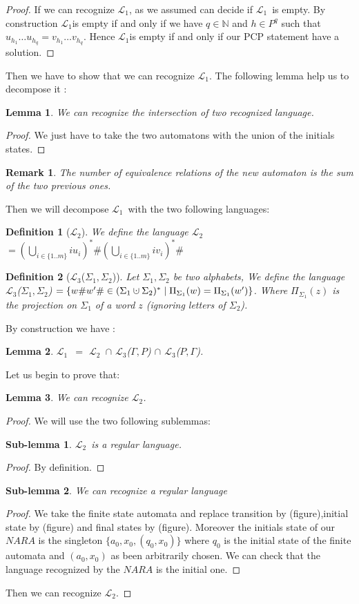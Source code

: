 \documentclass[a4paper,10pt]{report}
\newtheorem{lm}{Lemma}[thr]
\newtheorem{slm}{Sub-lemma}[lm]
\newtheorem{df}{Definition}
\newtheorem{rk}{Remark}
\newcommand{\Lu}{$\mathcal{L}_{1}$}
\newcommand{\Ld}{$\mathcal{L}_{2}$}
\newcommand{\Lt}{$\mathcal{L}_{3}$}
\newcommand{\sm}{\{1..m\}}
\newcommand{\cupdot}{\mathbin{\mathaccent\cdot\cup}}
\begin{document}
  \begin{proof}
   If we can recognize \Lu, as we assumed can decide if \Lu\ is empty.
   By construction \Lu is empty if and only if we have $q \in \mathbb N$ and  $h \in P ^ q$ such that $ u_{h_1}\ldots u_{h_q}  = v_{h_1}\ldots v_{h_q}$.
   Hence \Lu is empty if and only if our PCP statement have a solution.
  \end{proof}
  Then we have to show that we can recognize \Lu.
  The following lemma help us to decompose it :
  \begin{lm}
    We can recognize the intersection of two recognized language.
  \end{lm}
  \begin{proof}
   We just have to take the two automatons with the union of the initials states.
  \end{proof}
  \begin{rk}
   The number of equivalence relations of the new automaton is the sum of the two previous ones.
  \end{rk}
  Then we will decompose \Lu\ with the two following languages: 
  \begin{df}[\Ld]
    We define the language \Ld $= \left(\bigcup\limits_{i\in \sm} iu_i\right)^* \# \left(\bigcup\limits_{i\in \sm} iv_i\right)^* \# $
  \end{df}
  \begin{df}[\Lt($\Sigma_1,\Sigma_2$)]
    Let $\Sigma_1,\Sigma_2$ be two alphabets, 
    We define the language \Lt($\Sigma_1,\Sigma_2$) $= \{w\#w'\# \in (\Sigma_1 \cupdot \Sigma_2)^* \mid \Pi_{\Sigma_1}(w) = \Pi_{\Sigma_1}(w')\}$.
    Where $\Pi_{\Sigma_1}(z)$ is the projection on $\Sigma_1$ of a word $z$  (ignoring letters of $\Sigma_2$).
  \end{df}
  By construction we have :
  \begin{lm}
    \Lu\ $=$ \Ld\ $\cap$ \Lt($\Gamma,P$) $\cap$ \Lt($P,\Gamma$).
  \end{lm}
  Let us begin to prove that:  
   \begin{lm}
     We can recognize \Ld.
   \end{lm}
   \begin{proof}
     We will use the two following sublemmas:
  \begin{slm}
    \Ld\ is a regular language.
  \end{slm}
  \begin{proof}
    By definition.
  \end{proof}
  \begin{slm}
    We can recognize a regular language
  \end{slm}
  \begin{proof}
   We take the finite state automata and replace transition by (figure),initial state by (figure) and final states by (figure).
   Moreover the initials state of our $NARA$ is the singleton $\{a_0,x_0,(q_0,x_0)\}$ where $q_0$ is the initial state of the finite automata and $(a_0,x_0)$ as been arbitrarily chosen.
   We can check that the language recognized by the $NARA$ is the initial one.   
  \end{proof}
  Then we can recognize \Ld.
  \end{proof}
\end{document}
